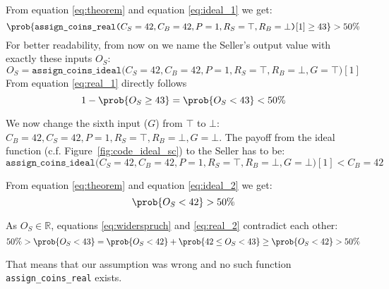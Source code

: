 \documentclass{cacthesis}
\begin{document}
From equation \ref{eq:theorem} and equation \ref{eq:ideal_1} we get:
\begin{equation}
\label{eq:real_1}
     \prob{ \texttt{assign\_coins\_real(}C_S=42,C_B=42,P=1,R_S=\top,R_B=\bot\texttt{)}[1] \geq 43} > 50\%
\end{equation}
For better readability, from now on we name the Seller's output value with exactly these inputs $O_S$:
\[O_S= \texttt{assign\_coins\_ideal(}C_S=42,C_B=42,P=1,R_S=\top,R_B=\bot,G=\top\texttt{)}[1]\]
From equation \ref{eq:real_1} directly follows
\begin{equation}
\label{eq:widerspruch}
     1-\prob{O_S \geq 43} =  \prob{O_S < 43} < 50\%
\end{equation}

We now change the sixth input ($G$) from $\top$ to $\bot$: $C_B=42,C_S=42,P=1,R_S=\top,R_B=\bot,G=\bot$. The payoff from the ideal function (c.f. Figure~\ref{fig:code_ideal_sc}) to the Seller has to be:
\begin{equation}
\label{eq:ideal_2}
    \texttt{assign\_coins\_ideal(}C_S=42,C_B=42,P=1, R_S=\top,R_B=\bot,G=\bot\texttt{)}[1] <  C_B = 42
\end{equation}

From equation \ref{eq:theorem} and equation \ref{eq:ideal_2} we get:
\begin{equation}
\label{eq:real_2}
    \prob{O_S < 42} > 50\%
\end{equation}

As $O_S\in \mathbb{R}$, equations \ref{eq:widerspruch} and \ref{eq:real_2} contradict each other:
\begin{equation}
   50\% > \prob{O_S <43} = \prob{O_S <42} + \prob{42 \leq O_S < 43} \geq \prob{O_S <42} > 50\%
\end{equation}%

That means that our assumption was wrong and no such function  \texttt{assign\_coins\_real} exists.\newline




\end{document}
